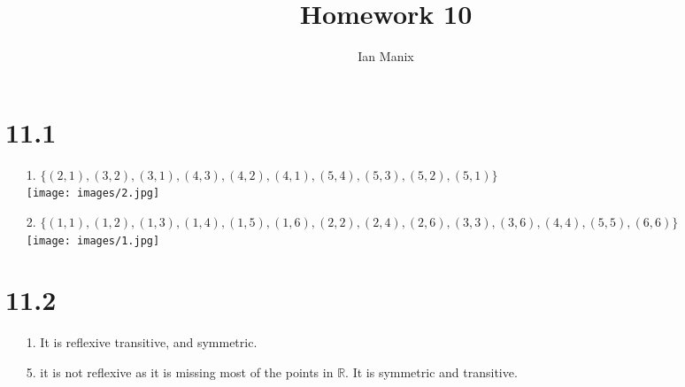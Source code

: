 \documentclass[sigconf]{article}
\title{
  \textbf{Homework 10} \\
  }
\author{ 
  Ian Manix
  }
\begin{document}



\maketitle




\section*{11.1}
\begin{itemize}
  \item[1.] $\{(2,1),(3,2),(3,1),(4,3),(4,2),(4,1),(5,4),(5,3),(5,2),(5,1)\}$\\
          \texttt{[image: images/2.jpg]}
  \item[2.] $\{(1,1),(1,2),(1,3),(1,4),(1,5),(1,6),(2,2),(2,4),(2,6),(3,3),(3,6),(4,4),(5,5),(6,6)\}$\\
          \texttt{[image: images/1.jpg]}
\end{itemize}

\section*{11.2}
\begin{itemize}
  \item[1.] It is reflexive transitive, and symmetric.
  \item[5.] it is not reflexive as it is missing most of the points in $\mathbb{R}$. It is symmetric and transitive.
\end{itemize}
\end{document}
